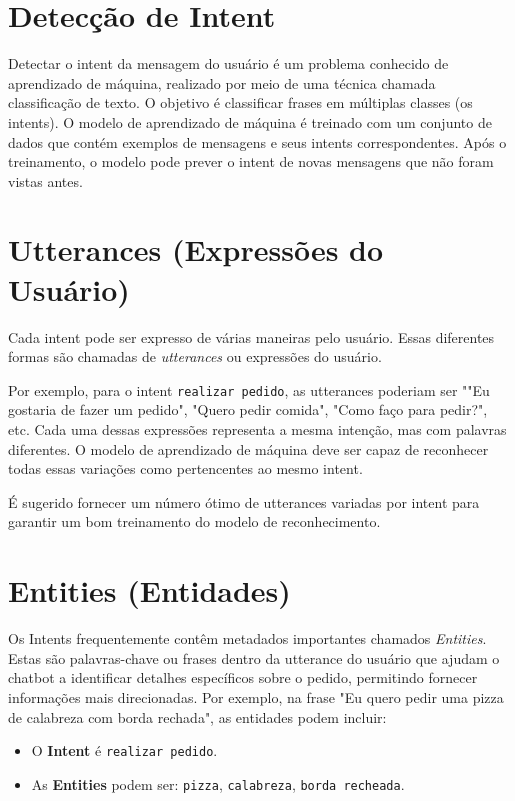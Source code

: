 \documentclass[14pt,a4paper,oneside]{book}
\begin{document}
\section{Detecção de Intent}
\label{sec:intents_deteccao}

Detectar o intent da mensagem do usuário é um problema conhecido de aprendizado de máquina, realizado por meio de uma técnica chamada classificação de texto. O objetivo é classificar frases em múltiplas classes (os intents). O modelo de aprendizado de máquina é treinado com um conjunto de dados que contém exemplos de mensagens e seus intents correspondentes. Após o treinamento, o modelo pode prever o intent de novas mensagens que não foram vistas antes.

\section{Utterances (Expressões do Usuário)}
\label{sec:intents_utterances}

Cada intent pode ser expresso de várias maneiras pelo usuário. Essas diferentes formas são chamadas de \textit{utterances} ou expressões do usuário. 

Por exemplo, para o intent \texttt{realizar pedido}, as utterances poderiam ser ""Eu gostaria de fazer um pedido", "Quero pedir comida", "Como faço para pedir?", etc. Cada uma dessas expressões representa a mesma intenção, mas com palavras diferentes. O modelo de aprendizado de máquina deve ser capaz de reconhecer todas essas variações como pertencentes ao mesmo intent.

É sugerido fornecer um número ótimo de utterances variadas por intent para garantir um bom treinamento do modelo de reconhecimento.

\section{Entities (Entidades)}
\label{sec:intents_entities}

Os Intents frequentemente contêm metadados importantes chamados \textit{Entities}. Estas são palavras-chave ou frases dentro da utterance do usuário que ajudam o chatbot a identificar detalhes específicos sobre o pedido, permitindo fornecer informações mais direcionadas. Por exemplo, na frase "Eu quero pedir uma pizza de calabreza com borda rechada", as entidades podem incluir:
\begin{itemize}
	\item O \textbf{Intent} é \texttt{realizar pedido}.
	\item As \textbf{Entities} podem ser: \texttt{pizza}, \texttt{calabreza}, \texttt{borda recheada}.
\end{itemize}
\end{document}
